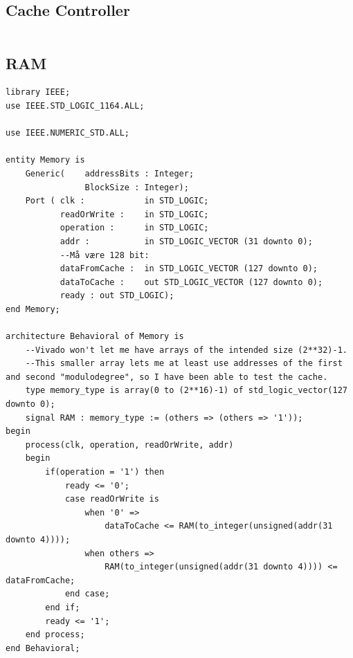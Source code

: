 \documentclass{article}
\begin{document}
\subsection{Cache Controller}
\begin{lstlisting}

\end{lstlisting}

\subsection{RAM}
\begin{lstlisting}
library IEEE;
use IEEE.STD_LOGIC_1164.ALL;

use IEEE.NUMERIC_STD.ALL;

entity Memory is
    Generic(    addressBits : Integer;
                BlockSize : Integer); 
    Port ( clk :            in STD_LOGIC;
           readOrWrite :    in STD_LOGIC;
           operation :      in STD_LOGIC;
           addr :           in STD_LOGIC_VECTOR (31 downto 0);
           --Må være 128 bit:
           dataFromCache :  in STD_LOGIC_VECTOR (127 downto 0);
           dataToCache :    out STD_LOGIC_VECTOR (127 downto 0);
           ready : out STD_LOGIC);
end Memory;

architecture Behavioral of Memory is
    --Vivado won't let me have arrays of the intended size (2**32)-1.
    --This smaller array lets me at least use addresses of the first and second "modulodegree", so I have been able to test the cache. 
    type memory_type is array(0 to (2**16)-1) of std_logic_vector(127 downto 0);
    signal RAM : memory_type := (others => (others => '1'));
begin
    process(clk, operation, readOrWrite, addr)
    begin
        if(operation = '1') then
            ready <= '0';
            case readOrWrite is
                when '0' => 
                    dataToCache <= RAM(to_integer(unsigned(addr(31 downto 4))));
                when others =>
                    RAM(to_integer(unsigned(addr(31 downto 4)))) <= dataFromCache;
            end case;
        end if;
        ready <= '1';
    end process; 
end Behavioral;
\end{lstlisting}
\end{document}
